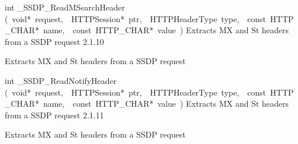 \documentclass{article}
\begin{document}
\begin{cxxentry}
\begin{cxxentry}
\begin{cxxfunction}
\begin{cxxdoc}
\end{cxxdoc}
\end{cxxfunction}
\begin{cxxfunction}
{int}
        {\_SSDP\_ReadMSearchHeader}
        {(\ void*\ request,\ \ HTTPSession*\ ptr,\ \ HTTPHeaderType\ type,\ \ const\ HTTP\_CHAR*\ name,\ \ const\ HTTP\_CHAR*\ value\ )}
        {Extracts MX and St headers from a SSDP request}
        {2.1.10}
\begin{cxxdoc}
Extracts MX and St headers from a SSDP request


\end{cxxdoc}
\end{cxxfunction}
\begin{cxxfunction}
{int}
        {\_SSDP\_ReadNotifyHeader}
        {(\ void*\ request,\ \ HTTPSession*\ ptr,\ \ HTTPHeaderType\ type,\ \ const\ HTTP\_CHAR*\ name,\ \ const\ HTTP\_CHAR*\ value\ )}
        {Extracts MX and St headers from a SSDP request}
        {2.1.11}
\begin{cxxdoc}
Extracts MX and St headers from a SSDP request



\end{cxxdoc}
\end{cxxfunction}
\end{cxxentry}
\end{cxxentry}
\end{document}
